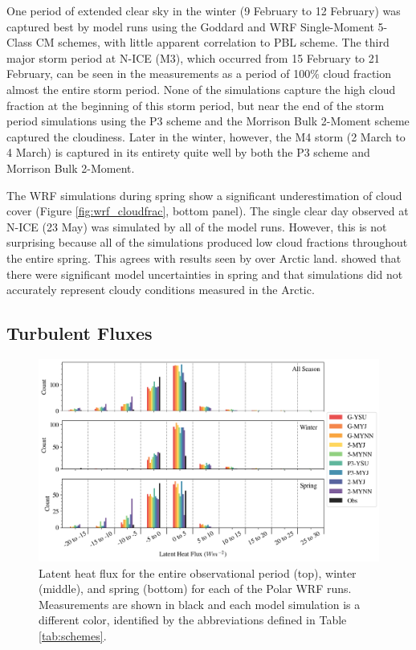 One period of extended clear sky in the winter (9 February to 12 February) was captured best by model runs using the Goddard and WRF Single-Moment 5-Class CM schemes, with little apparent correlation to PBL scheme. The third major storm period at N-ICE (M3), which occurred from 15 February to 21 February, can be seen in the measurements as a period of 100$\%$ cloud fraction almost the entire storm period. None of the simulations capture the high cloud fraction at the beginning of this storm period, but near the end of the storm period simulations using the P3 scheme and the Morrison Bulk 2-Moment scheme captured the cloudiness. Later in the winter, however, the M4 storm (2 March to 4 March) is captured in its entirety quite well by both the P3 scheme and Morrison Bulk 2-Moment. 

The WRF simulations during spring show a significant underestimation of cloud cover (Figure \ref{fig:wrf_cloudfrac}, bottom panel). The single clear day observed at N-ICE (23 May) was simulated by all of the model runs. However, this is not surprising because all of the simulations produced low cloud fractions throughout the entire spring. This agrees with results seen by \citet{hines:2011} over Arctic land. \citet{hines:2011} showed that there were significant model uncertainties in spring and that simulations did not accurately represent cloudy conditions measured in the Arctic. 

\subsection{Turbulent Fluxes}

\begin{figure}[h]
    \centering
    \includegraphics[width=1\linewidth]{figures/chapter3/WRF_LHF_Histo.png}
    \caption[Polar WRF simulated latent heat flux histograms.]{Latent heat flux for the entire observational period (top), winter (middle), and spring (bottom) for each of the Polar WRF runs. Measurements are shown in black and each model simulation is a different color, identified by the abbreviations defined in Table \ref{tab:schemes}.}
    \label{fig:wrf_hlf}
\end{figure}

